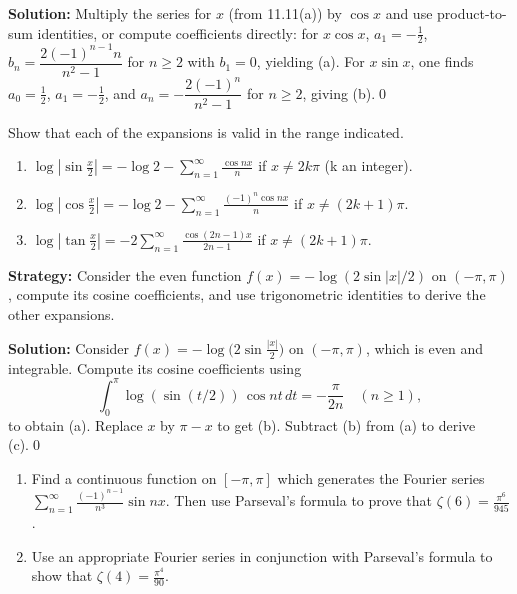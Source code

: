 \bigskip\noindent\textbf{Solution:}
Multiply the series for $x$ (from 11.11(a)) by $\cos x$ and use product-to-sum identities, or compute coefficients directly: for $x\cos x$, $a_1= -\tfrac{1}{2}$, $b_n=\dfrac{2(-1)^{n-1}n}{n^2-1}$ for $n\ge2$ with $b_1=0$, yielding (a). For $x\sin x$, one finds $a_0=\tfrac{1}{2}$, $a_1=-\tfrac{1}{2}$, and $a_n= -\dfrac{2(-1)^n}{n^2-1}$ for $n\ge2$, giving (b).\qed


\begin{problembox}
\begin{problemstatement}
Show that each of the expansions is valid in the range indicated.
\begin{enumerate}[label=(\alph*)]
\item $\log \left| \sin \frac{x}{2} \right| = -\log 2 - \sum_{n=1}^\infty \frac{\cos nx}{n}$ if $x \neq 2k\pi$ (k an integer).
\item $\log \left| \cos \frac{x}{2} \right| = -\log 2 - \sum_{n=1}^\infty \frac{(-1)^n \cos nx}{n}$ if $x \neq (2k + 1)\pi$.
\item $\log \left| \tan \frac{x}{2} \right| = -2 \sum_{n=1}^\infty \frac{\cos (2n - 1)x}{2n - 1}$ if $x \neq (2k + 1)\pi$.
\end{enumerate}
\end{problemstatement}
\end{problembox}

\noindent\textbf{Strategy:} Consider the even function $f(x)=-\log(2\sin|x|/2)$ on $(-\pi,\pi)$, compute its cosine coefficients, and use trigonometric identities to derive the other expansions.

\bigskip\noindent\textbf{Solution:}
Consider $f(x)= -\log\big(2\sin\tfrac{|x|}{2}\big)$ on $(-\pi,\pi)$, which is even and integrable. Compute its cosine coefficients using
\[\int_0^{\pi} \log(\sin(t/2))\,\cos nt\,dt = -\frac{\pi}{2n}\quad (n\ge1),\]
to obtain (a). Replace $x$ by $\pi-x$ to get (b). Subtract (b) from (a) to derive (c).\qed


\begin{problembox}
\begin{problemstatement}
\begin{enumerate}[label=(\alph*)]
\item Find a continuous function on $[-\pi, \pi]$ which generates the Fourier series $\sum_{n=1}^\infty \frac{(-1)^{n-1}}{n^3} \sin nx$. Then use Parseval's formula to prove that $\zeta(6) = \frac{\pi^6}{945}$.
\item Use an appropriate Fourier series in conjunction with Parseval's formula to show that $\zeta(4) = \frac{\pi^4}{90}$.
\end{enumerate}
\end{problemstatement}
\end{problembox}

